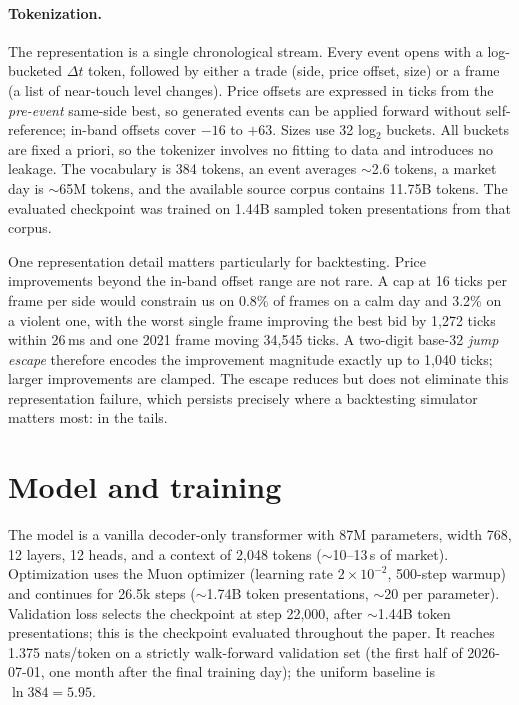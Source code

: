 \documentclass[11pt]{article}
\begin{document}
\paragraph{Tokenization.} The representation is a single chronological stream. Every event opens with a log-bucketed $\Delta t$ token, followed by either a trade (side, price offset, size) or a frame (a list of near-touch level changes). Price offsets are expressed in ticks from the \emph{pre-event} same-side best, so generated events can be applied forward without self-reference; in-band offsets cover $-16$ to $+63$. Sizes use 32 log$_2$ buckets. All buckets are fixed a priori, so the tokenizer involves no fitting to data and introduces no leakage. The vocabulary is 384 tokens, an event averages $\sim$2.6 tokens, a market day is $\sim$65M tokens, and the available source corpus contains 11.75B tokens. The evaluated checkpoint was trained on 1.44B sampled token presentations from that corpus.

One representation detail matters particularly for backtesting. Price improvements beyond the in-band offset range are not rare. A cap at 16 ticks per frame per side would constrain us on 0.8\% of frames on a calm day and 3.2\% on a violent one, with the worst single frame improving the best bid by 1,272 ticks within 26\,ms and one 2021 frame moving 34,545 ticks. A two-digit base-32 \emph{jump escape} therefore encodes the improvement magnitude exactly up to 1,040 ticks; larger improvements are clamped. The escape reduces but does not eliminate this representation failure, which persists precisely where a backtesting simulator matters most: in the tails.

\section{Model and training}
\label{sec:model}

The model is a vanilla decoder-only transformer with 87M parameters, width 768, 12 layers, 12 heads, and a context of 2,048 tokens ($\sim$10--13\,s of market). Optimization uses the Muon optimizer (learning rate $2\times10^{-2}$, 500-step warmup) and continues for 26.5k steps ($\sim$1.74B token presentations, $\sim$20 per parameter). Validation loss selects the checkpoint at step 22{,}000, after $\sim$1.44B token presentations; this is the checkpoint evaluated throughout the paper. It reaches 1.375 nats/token on a strictly walk-forward validation set (the first half of 2026-07-01, one month after the final training day); the uniform baseline is $\ln 384 = 5.95$.
\end{document}
